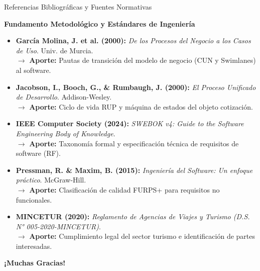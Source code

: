 \documentclass[aspectratio=169, 10pt]{beamer}
\begin{document}
\begin{frame}{Referencias Bibliográficas y Fuentes Normativas}
    \begin{block}{\textbf{Fundamento Metodológico y Estándares de Ingeniería}}
        \footnotesize
        \begin{itemize}
            \item \textbf{García Molina, J. et al. (2000):} \textit{De los Procesos del Negocio a los Casos de Uso}. Univ. de Murcia. \\
            \small $\rightarrow$ \textbf{Aporte:} Pautas de transición del modelo de negocio (CUN y Swimlanes) al software.
            
            \item \textbf{Jacobson, I., Booch, G., \& Rumbaugh, J. (2000):} \textit{El Proceso Unificado de Desarrollo}. Addison-Wesley. \\
            \small $\rightarrow$ \textbf{Aporte:} Ciclo de vida RUP y máquina de estados del objeto cotización.
            
            \item \textbf{IEEE Computer Society (2024):} \textit{SWEBOK v4: Guide to the Software Engineering Body of Knowledge}. \\
            \small $\rightarrow$ \textbf{Aporte:} Taxonomía formal y especificación técnica de requisitos de software (RF).
            
            \item \textbf{Pressman, R. \& Maxim, B. (2015):} \textit{Ingeniería del Software: Un enfoque práctico}. McGraw-Hill. \\
            \small $\rightarrow$ \textbf{Aporte:} Clasificación de calidad FURPS+ para requisitos no funcionales.
            
            \item \textbf{MINCETUR (2020):} \textit{Reglamento de Agencias de Viajes y Turismo (D.S. N° 005-2020-MINCETUR)}. \\
            \small $\rightarrow$ \textbf{Aporte:} Cumplimiento legal del sector turismo e identificación de partes interesadas.
        \end{itemize}
    \end{block}
\end{frame}

\begin{frame}
    \centering
    \vspace{1cm}
    {\huge \textbf{¡Muchas Gracias!}}\\[0.6cm]
\end{frame}
\end{document}
